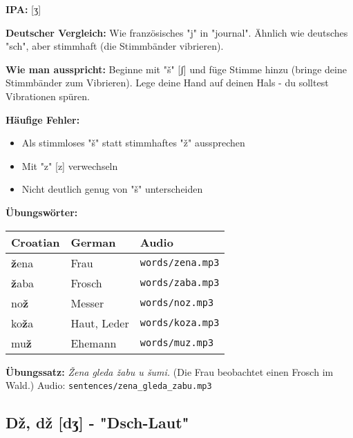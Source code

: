 \begin{tcolorbox}[breakable, colback=lightblue!30, colframe=croatianblue, title=\textbf{Ž, ž}]

\textbf{IPA:} [ʒ]

\textbf{Deutscher Vergleich:}
Wie französisches "j" in "journal". Ähnlich wie deutsches "sch", aber stimmhaft (die Stimmbänder vibrieren).

\textbf{Wie man ausspricht:}
Beginne mit "š" [ʃ] und füge Stimme hinzu (bringe deine Stimmbänder zum Vibrieren). Lege deine Hand auf deinen Hals - du solltest Vibrationen spüren.

\textbf{Häufige Fehler:}
\begin{itemize}
    \item Als stimmloses "š" statt stimmhaftes "ž" aussprechen
    \item Mit "z" [z] verwechseln
    \item Nicht deutlich genug von "š" unterscheiden
\end{itemize}

\textbf{Übungswörter:}
\begin{center}
\small
\begin{tabular}{lll}
\textbf{Croatian} & \textbf{German} & \textbf{Audio} \\
\midrule
\textbf{ž}ena & Frau & \small\texttt{words/zena.mp3} \\
\textbf{ž}aba & Frosch & \small\texttt{words/zaba.mp3} \\
no\textbf{ž} & Messer & \small\texttt{words/noz.mp3} \\
ko\textbf{ž}a & Haut, Leder & \small\texttt{words/koza.mp3} \\
mu\textbf{ž} & Ehemann & \small\texttt{words/muz.mp3} \\
\end{tabular}
\end{center}

\textbf{Übungssatz:}
\textit{Žena gleda žabu u šumi.}
(Die Frau beobachtet einen Frosch im Wald.)
Audio: \small\texttt{sentences/zena\_gleda\_zabu.mp3}

\end{tcolorbox}

\subsection{Dž, dž [dʒ] - "Dsch-Laut"}

